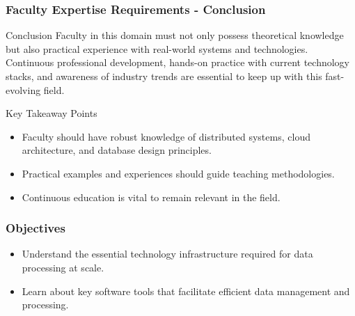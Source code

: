 \documentclass[aspectratio=169]{beamer}
\begin{document}
\begin{frame}[fragile]
    \frametitle{Faculty Expertise Requirements - Conclusion}
    \begin{block}{Conclusion}
        Faculty in this domain must not only possess theoretical knowledge but also practical experience with real-world systems and technologies. Continuous professional development, hands-on practice with current technology stacks, and awareness of industry trends are essential to keep up with this fast-evolving field.
    \end{block}

    \begin{block}{Key Takeaway Points}
        \begin{itemize}
            \item Faculty should have robust knowledge of distributed systems, cloud architecture, and database design principles.
            \item Practical examples and experiences should guide teaching methodologies.
            \item Continuous education is vital to remain relevant in the field.
        \end{itemize}
    \end{block}
\end{frame}

\begin{frame}
    \titlepage
\end{frame}

\begin{frame}[fragile]
    \frametitle{Objectives}
    \begin{itemize}
        \item Understand the essential technology infrastructure required for data processing at scale.
        \item Learn about key software tools that facilitate efficient data management and processing.
    \end{itemize}
\end{frame}
\end{document}
